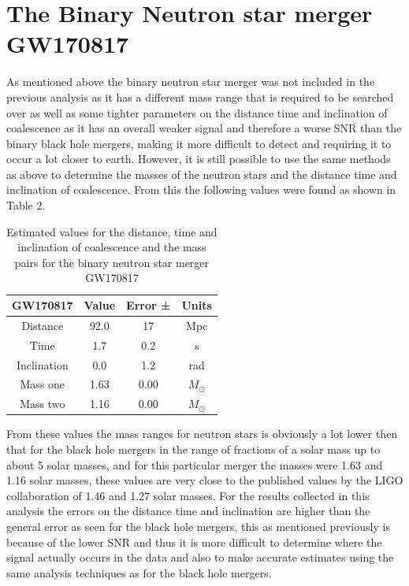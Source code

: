 \documentclass{article}
\begin{document}
\section*{The Binary Neutron star \newline merger GW170817}
As mentioned above the binary neutron star \newline merger was not included in the previous analysis as it has a different mass range that is required to be
searched over as well as some tighter parameters on the distance time and inclination of coalescence as it has an overall weaker signal and therefore
a worse SNR than the binary black hole mergers, making it more difficult to detect and requiring it to occur a lot closer to earth.
However, it is still possible to use the same methods as above to determine the masses of the neutron stars and the distance time and inclination of coalescence.
From this the following values were found as shown in Table 2.
\begin{table}[h]
    \begin{center}
        \caption{Estimated values for the distance, time and inclination of coalescence and the mass pairs for the binary neutron star merger GW170817}
        \label{tab:estimates}
        \begin{tabular}{|c c c c|}
            \hline
            GW170817 & Value & Error ±& Units\\
            \hline
            Distance & 92.0 & 17 & Mpc\\
            Time & 1.7 & 0.2 & s\\
            Inclination & 0.0 & 1.2 & rad\\
            Mass one & 1.63 & 0.00 & $M_{\odot}$\\
            Mass two & 1.16 & 0.00 & $M_{\odot}$\\
            \hline
        \end{tabular}

    \end{center}
\end{table}

From these values the mass ranges for neutron stars is obviously a lot lower then that for the
black hole mergers in the range of fractions of a solar mass up to about 5 solar masses,
and for this particular merger the masses were 1.63 and 1.16 solar masses, these values are very close to the
published values by the LIGO collaboration of 1.46 and 1.27 solar masses. For the results collected
in this analysis the errors on the distance time and inclination are higher than the general error as seen for the
black hole mergers, this as mentioned previously is because of the lower SNR and thus
it is more difficult to determine where the signal actually occurs in the data
and also to make accurate estimates using the same analysis techniques as
for the black hole mergers.
\end{document}

